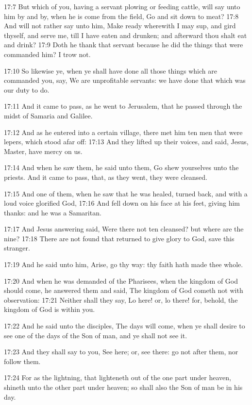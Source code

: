 17:7 But which of you, having a servant plowing or feeding cattle,
will say unto him by and by, when he is come from the field, Go and
sit down to meat?  17:8 And will not rather say unto him, Make ready
wherewith I may sup, and gird thyself, and serve me, till I have eaten
and drunken; and afterward thou shalt eat and drink?  17:9 Doth he
thank that servant because he did the things that were commanded him?
I trow not.

17:10 So likewise ye, when ye shall have done all those things which
are commanded you, say, We are unprofitable servants: we have done
that which was our duty to do.

17:11 And it came to pass, as he went to Jerusalem, that he passed
through the midst of Samaria and Galilee.

17:12 And as he entered into a certain village, there met him ten men
that were lepers, which stood afar off: 17:13 And they lifted up their
voices, and said, Jesus, Master, have mercy on us.

17:14 And when he saw them, he said unto them, Go shew yourselves unto
the priests. And it came to pass, that, as they went, they were
cleansed.

17:15 And one of them, when he saw that he was healed, turned back,
and with a loud voice glorified God, 17:16 And fell down on his face
at his feet, giving him thanks: and he was a Samaritan.

17:17 And Jesus answering said, Were there not ten cleansed? but where
are the nine?  17:18 There are not found that returned to give glory
to God, save this stranger.

17:19 And he said unto him, Arise, go thy way: thy faith hath made
thee whole.

17:20 And when he was demanded of the Pharisees, when the kingdom of
God should come, he answered them and said, The kingdom of God cometh
not with observation: 17:21 Neither shall they say, Lo here! or, lo
there! for, behold, the kingdom of God is within you.

17:22 And he said unto the disciples, The days will come, when ye
shall desire to see one of the days of the Son of man, and ye shall
not see it.

17:23 And they shall say to you, See here; or, see there: go not after
them, nor follow them.

17:24 For as the lightning, that lighteneth out of the one part under
heaven, shineth unto the other part under heaven; so shall also the
Son of man be in his day.

